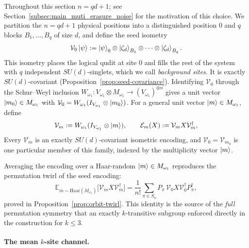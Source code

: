 \documentclass[10pt,twocolumn,superscriptaddress,aps,amsmath,amssymb,citeautoscript,floatfix,prx]{revtex4-2}
\theoremstyle{plain}
\theoremstyle{plain}
\theoremstyle{plain}
\theoremstyle{plain}
\theoremstyle{plain}
\theoremstyle{plain}
\theoremstyle{plain}
\theoremstyle{definition}
\theoremstyle{plain}
\begin{document}
Throughout this section $n=qd+1$; see Section~\ref{subsec:main_muti_erasure_noise} for the motivation of this choice.
We partition the $n=qd+1$ physical positions into a distinguished position $0$ and $q$ blocks $B_1,\ldots,B_q$ of size $d$, and define the seed isometry
$$
\mathcal{V}_0\ket\psi
:=
\ket\psi_0\otimes\ket{\zeta_d}_{B_1}\otimes\cdots\otimes\ket{\zeta_d}_{B_q}.
$$
This isometry places the logical qudit at site $0$ and fills the rest of the system with $q$ independent $SU(d)$-singlets, which we call \textit{background sites}. It is exactly $SU(d)$-covariant (Proposition~\ref{prop:seed-covariance}). 
Identifying $\mathcal{V}_0$ through the Schur--Weyl inclusion $W_{\omega_1}:V_{\omega_1}\otimes M_{\omega_1}\to(V_{\omega_1})^{\otimes n}$ gives a unit vector $\ket{m_0}\in M_{\omega_1}$ with $\mathcal{V}_0=W_{\omega_1}(I_{V_{\omega_1}}\otimes\ket{m_0})$. 
For a general unit vector $\ket m\in M_{\omega_1}$, define
$$
\mathcal{V}_m
:=
W_{\omega_1}(I_{V_{\omega_1}}\otimes\ket m),
\qquad
\mathcal E_m(X):=\mathcal{V}_mX\mathcal{V}_m^\dagger,
$$
Every $\mathcal{V}_m$ is an exactly $SU(d)$-covariant isometric encoding, and $\mathcal{V}_0=\mathcal{V}_{m_0}$ is one particular member of this family, 
indexed by the multiplicity vector $\ket m$.

Averaging the encoding over a Haar-random $\ket m\in M_{\omega_1}$ reproduces the permutation twirl of the seed encoding:
$$
\mathbb E_{m\sim\mathrm{Haar}(M_{\omega_1})}
\bigl[\mathcal{V}_mX\mathcal{V}_m^\dagger\bigr]
=
\frac1{n!}
\sum_{\pi\in S_n}
P_\pi\,\mathcal{V}_0X\mathcal{V}_0^\dagger P_\pi^\dagger,
$$
proved in Proposition~\ref{prop:orbit-twirl}. This identity is the source of the \textit{full} permutation symmetry 
that an exactly $k$-transitive subgroup enforced directly in the construction for $k\le3$.

\paragraph{The mean $k$-site channel.}
\end{document}
